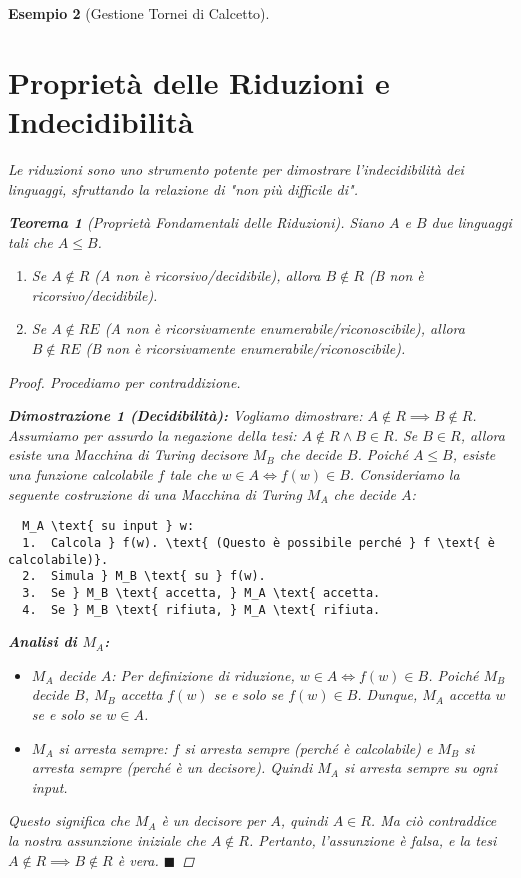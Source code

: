 \documentclass[a4paper]{article}
\newtheorem{theorem}{Teorema}[section] %
\newtheorem{example}[theorem]{Esempio}
\begin{document}
\begin{example}[Gestione Tornei di Calcetto]
\section{Proprietà delle Riduzioni e Indecidibilità}

Le riduzioni sono uno strumento potente per dimostrare l'indecidibilità dei linguaggi, sfruttando la relazione di "non più difficile di".

\begin{theorem}[Proprietà Fondamentali delle Riduzioni]
Siano $A$ e $B$ due linguaggi tali che $A \le B$.
\begin{enumerate}
    \item Se $A \notin R$ (A non è ricorsivo/decidibile), allora $B \notin R$ (B non è ricorsivo/decidibile).
    \item Se $A \notin RE$ (A non è ricorsivamente enumerabile/riconoscibile), allora $B \notin RE$ (B non è ricorsivamente enumerabile/riconoscibile).
\end{enumerate}
\end{theorem}

\begin{proof}
Procediamo per contraddizione.

\textbf{Dimostrazione 1 (Decidibilità):}
Vogliamo dimostrare: $A \notin R \implies B \notin R$.
Assumiamo per assurdo la negazione della tesi: $A \notin R \land B \in R$.
Se $B \in R$, allora esiste una Macchina di Turing decisore $M_B$ che decide $B$.
Poiché $A \le B$, esiste una funzione calcolabile $f$ tale che $w \in A \iff f(w) \in B$.
Consideriamo la seguente costruzione di una Macchina di Turing $M_A$ che decide $A$:

\begin{verbatim}
  M_A \text{ su input } w:
  1.  Calcola } f(w). \text{ (Questo è possibile perché } f \text{ è calcolabile)}.
  2.  Simula } M_B \text{ su } f(w).
  3.  Se } M_B \text{ accetta, } M_A \text{ accetta.
  4.  Se } M_B \text{ rifiuta, } M_A \text{ rifiuta.
\end{verbatim}

\textbf{Analisi di $M_A$:}
\begin{itemize}
    \item $M_A$ decide $A$: Per definizione di riduzione, $w \in A \iff f(w) \in B$. Poiché $M_B$ decide $B$, $M_B$ accetta $f(w)$ se e solo se $f(w) \in B$. Dunque, $M_A$ accetta $w$ se e solo se $w \in A$.
    \item $M_A$ si arresta sempre: $f$ si arresta sempre (perché è calcolabile) e $M_B$ si arresta sempre (perché è un decisore). Quindi $M_A$ si arresta sempre su ogni input.
\end{itemize}
Questo significa che $M_A$ è un decisore per $A$, quindi $A \in R$.
Ma ciò contraddice la nostra assunzione iniziale che $A \notin R$.
Pertanto, l'assunzione è falsa, e la tesi $A \notin R \implies B \notin R$ è vera.
$\blacksquare$


\end{proof}
\end{example}
\end{document}
